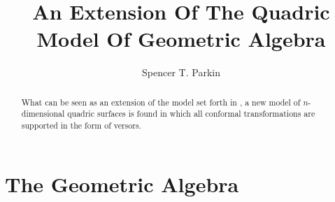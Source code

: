 \documentclass{birkjour}
\theoremstyle{definition}
\theoremstyle{remark}
\numberwithin{equation}{section}
\begin{document}
\title{An Extension Of The Quadric Model Of Geometric Algebra}

\author{Spencer T. Parkin}
\address{%
2113 S. Claremont Dr.\\
Bountiful, Utah  84010\\
USA}





\begin{abstract}
What can be seen as an extension of the model set forth
in \cite{Parkin12}, a new model of $n$-dimensional quadric surfaces is
found in which all conformal transformations are supported in the
form of versors.
\end{abstract}

\maketitle

\section{The Geometric Algebra}
\end{document}
